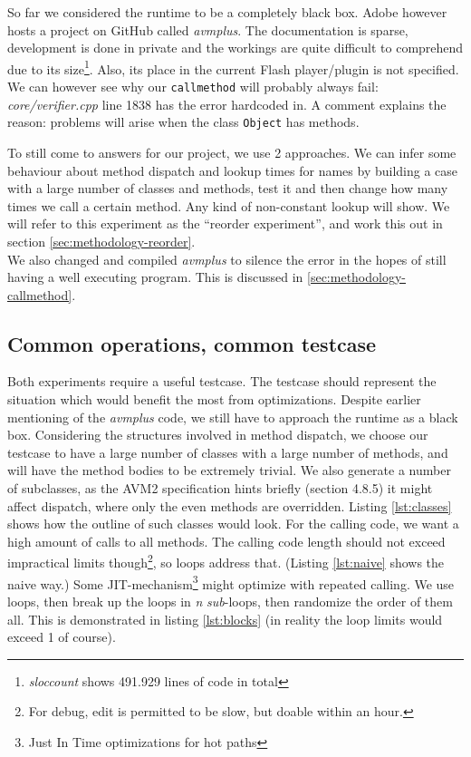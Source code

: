 \documentclass[a4paper,11pt]{scrartcl}
\begin{document}
So far we considered the runtime to be a completely black box. Adobe however hosts a project on GitHub called \textit{avmplus}. The documentation is sparse, development is done in private and the workings are quite difficult to comprehend due to its size\footnote{\textit{sloccount} shows 491.929 lines of code in total}. Also, its place in the current Flash player/plugin is not specified. We can however see why our \texttt{callmethod} will probably always fail: \textit{core/verifier.cpp} line 1838 has the error hardcoded in. A comment explains the reason: problems will arise when the class \texttt{Object} has methods.

To still come to answers for our project, we use 2 approaches. We can infer some behaviour about method dispatch and lookup times for names by building a case with a large number of classes and methods, test it and then change how many times we call a certain method. Any kind of non-constant lookup will show. We will refer to this experiment as the ``reorder experiment'',  and work this out in section \ref{sec:methodology-reorder}. \\
We also changed and compiled \textit{avmplus} to silence the error in the hopes of still having a well executing program. This is discussed in \ref{sec:methodology-callmethod}. 

\subsection{Common operations, common testcase}
\label{sec:methodology-common}
Both experiments require a useful testcase. The testcase should represent the situation which would benefit the most from optimizations. Despite earlier mentioning of the \textit{avmplus} code, we still have to approach the runtime as a black box. Considering the structures involved in method dispatch, we choose our testcase to have a large number of classes with a large number of methods, and will have the method bodies to be extremely trivial. We also generate a number of subclasses, as the AVM2 specification hints briefly (section 4.8.5) it might affect dispatch, where only the even methods are overridden. Listing \ref{lst:classes} shows how the outline of such classes would look. For the calling code, we want a high amount of calls to all methods. The calling code length should not exceed impractical limits though\footnote{For debug, edit is permitted to be slow, but doable within an hour.}, so loops address that. (Listing \ref{lst:naive} shows the naive way.) Some JIT-mechanism\footnote{Just In Time optimizations for hot paths} might optimize with repeated calling. We use loops, then break up the loops in \textit{n} \textit{sub}-loops, then randomize the order of them all. This is demonstrated in listing \ref{lst:blocks} (in reality the loop limits would exceed 1 of course).
\end{document}
